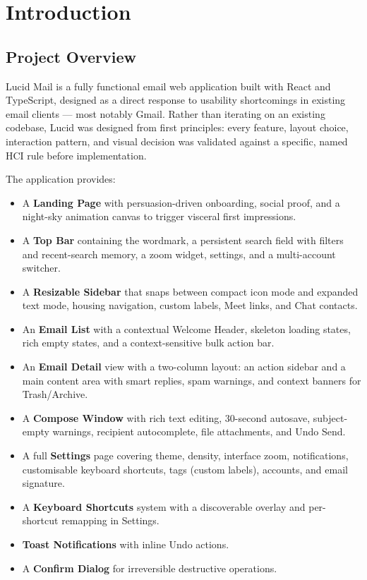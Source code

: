 \documentclass[12pt,a4paper]{report}
\begin{document}
\chapter{Introduction}

\section{Project Overview}

Lucid Mail is a fully functional email web application built with React and TypeScript,
designed as a direct response to usability shortcomings in existing email clients —
most notably Gmail. Rather than iterating on an existing codebase, Lucid was designed
from first principles: every feature, layout choice, interaction pattern, and visual
decision was validated against a specific, named HCI rule before implementation.

The application provides:

\begin{itemize}[leftmargin=*, itemsep=2pt]
  \item A \textbf{Landing Page} with persuasion-driven onboarding, social proof, and a night-sky
        animation canvas to trigger visceral first impressions.
  \item A \textbf{Top Bar} containing the wordmark, a persistent search field with filters and
        recent-search memory, a zoom widget, settings, and a multi-account switcher.
  \item A \textbf{Resizable Sidebar} that snaps between compact icon mode and expanded text mode,
        housing navigation, custom labels, Meet links, and Chat contacts.
  \item An \textbf{Email List} with a contextual Welcome Header, skeleton loading states, rich
        empty states, and a context-sensitive bulk action bar.
  \item An \textbf{Email Detail} view with a two-column layout: an action sidebar and a main
        content area with smart replies, spam warnings, and context banners for Trash/Archive.
  \item A \textbf{Compose Window} with rich text editing, 30-second autosave, subject-empty
        warnings, recipient autocomplete, file attachments, and Undo Send.
  \item A full \textbf{Settings} page covering theme, density, interface zoom, notifications,
        customisable keyboard shortcuts, tags (custom labels), accounts, and email signature.
  \item A \textbf{Keyboard Shortcuts} system with a discoverable overlay and per-shortcut
        remapping in Settings.
  \item \textbf{Toast Notifications} with inline Undo actions.
  \item A \textbf{Confirm Dialog} for irreversible destructive operations.
\end{itemize}
\end{document}
